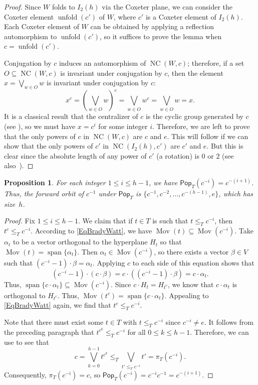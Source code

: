 \documentclass[10pt,a4paper]{amsart}
\newtheorem{prop}[prop]{Proposition}
\newcommand{\pop}{\mathsf{Pop}}
\DeclareMathOperator{\spn}{span}
\DeclareMathOperator{\NC}{NC}
\DeclareMathOperator{\mov}{Mov}
\DeclareMathOperator{\unfold}{unfold}
\begin{document}
\begin{proof}
Since $W$ folds to $I_2(h)$ via the Coxeter plane, we can consider the Coxeter element $\unfold(c')$ of $W$, where $c'$ is a Coxeter element of $I_2(h)$. Each Coxeter element of $W$ can be obtained by applying a reflection automorphism to $\unfold(c')$, so it suffices to prove the lemma when $c=\unfold(c')$.

Conjugation by $c$ induces an automorphism of $\NC(W,c)$; therefore, if a set $O \subseteq \NC(W,c)$ is invariant under conjugation by $c$, then the element $x=\bigvee_{w \in O} w$ is invariant under conjugation by $c$:
	\[
x^c = \left(\bigvee_{w \in O} w\right)^c = \bigvee_{w \in O} w^c = \bigvee_{w \in O} w = x.
\]
It is a classical result that the centralizer of $c$ is the cyclic group generated by $c$ (see \cite[Proposition~30]{Carter}), so we must have $x=c^i$ for some integer $i$.  Therefore, we are left to prove that the only powers of $c$ in $\NC(W,c)$ are $c$ and $e$. This will follow if we can show that the only powers of $c'$ in $\NC(I_2(h),c')$ are $c'$ and $e$.  But this is clear since the absolute length of any power of $c'$ (a rotation) is $0$ or $2$ (see also~\cite[Lemma~12.2]{bessis2015finite}).
\end{proof}

\begin{prop}
For each integer $1\leq i\leq h-1$, we have $\pop_T(c^{-i})=c^{-(i+1)}$. Thus, the forward orbit of $c^{-1}$ under $\pop_T$ is $\{c^{-1},c^{-2},\ldots,c^{-(h-1)},e\}$, which has size~$h$.
\label{prop:forward_cinv}
\end{prop}

\begin{proof}
Fix $1\leq i\leq h-1$. We claim that if $t\in T$ is such that $t \leq_T c^{-i}$, then $t^c \leq_T c^{-i}$.  According to \eqref{EqBradyWatt}, we have $\mov(t) \subseteq \mov(c^{-i})$.  Take $\alpha_t$ to be a vector orthogonal to the hyperplane $H_t$ so that $\mov(t) = \spn\{\alpha_t\}$.  Then $\alpha_t\in\mov(c^{-i})$, so there exists a vector $\beta\in V$ such that $(c^{-i}-1)\cdot\beta = \alpha_t$. Applying $c$ to each side of this equation shows that 
\[
(c^{-i}-1)\cdot(c\cdot\beta)=c\cdot((c^{-i}-1)\cdot\beta)=c\cdot\alpha_t.
\]
 Thus, $\spn\{c\cdot\alpha_t\}\subseteq\mov(c^{-i})$. Since $c\cdot H_t=H_{t^c}$, we know that $c\cdot\alpha_t$ is orthogonal to $H_{t^c}$. Thus, $\mov(t^c)=\spn\{c\cdot\alpha_t\}$. Appealing to \eqref{EqBradyWatt} again, we find that $t^c\leq_T c^{-i}$. 

Note that there must exist some $t\in T$ with $t \leq_T c^{-i}$ since $c^{-i} \neq e$. It follows from the preceding paragraph that $t^{c^k}\leq_T c^{-i}$ for all $0\leq k\leq h-1$. Therefore, we can use  to see that 
\[
c=\bigvee\limits_{k=0}^{h-1} t^{c^{k}}\leq_T\bigvee_{t'\leq_T c^{-i}}t'=\pi_T(c^{-i}).
\]
 Consequently, $\pi_T(c^{-i})=c$, so $\pop_T(c^{-i})=c^{-i}c^{-1}=c^{-(i+1)}$. 
\end{proof}
\end{document}
